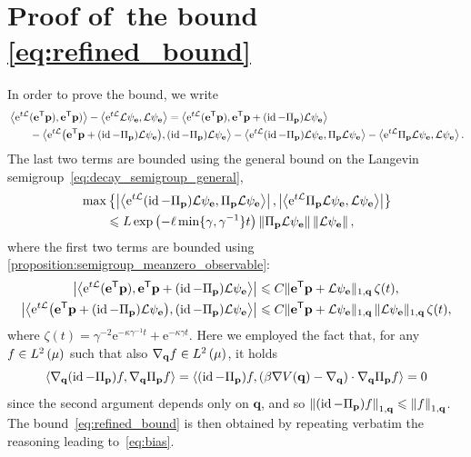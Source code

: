 \documentclass[11pt,a4paper]{article}
\DeclareMathOperator{\id}{id}
\newcommand{\e}{\mathrm{e}}
\newcommand{\grad}{\nabla}
\newcommand{\vect}[1]{\boldsymbol{\mathbf #1}}
\renewcommand{\t}{\mathsf T}
\theoremstyle{plain}
\numberwithin{equation}{section}
\renewcommand{\leq}{\leqslant}
\begin{document}
\section{Proof of~\texorpdfstring{the bound \eqref{eq:refined_bound}}{the technical bound on the bias}}%
\label{sec:proof_technical_result}
In order to prove the bound,
we write
\begin{align*}
    &\ip{\e^{t \mathcal L}(\vect e^\t \vect p)}{\vect e^\t \vect p)} - \ip{\e^{t \mathcal L} \mathcal L \psi_{\vect e}}{\mathcal L \psi_{\vect e}}
    = \ip{\e^{t \mathcal L} (\vect e^\t \vect p)}{\vect e^\t \vect p + (\id - \Pi_{\vect p}) \mathcal L \psi_{\vect e}} \\
    &\qquad - \ip{\e^{t \mathcal L} \bigl(\vect e^\t \vect p + (\id - \Pi_{\vect p}) \mathcal L \psi_{\vect e}\bigr)}{(\id - \Pi_{\vect p}) \mathcal L \psi_{\vect e}}
    - \ip{\e^{t \mathcal L} (\id - \Pi_{\vect p}) \mathcal L \psi_{\vect e}}{\Pi_{\vect p} \mathcal L \psi_{\vect e}}
    - \ip{\e^{t \mathcal L} \Pi_{\vect p} \mathcal L \psi_{\vect e}}{\mathcal L \psi_{\vect e}}.
\end{align*}
The last two terms are bounded using the general bound on the Langevin semigroup~\eqref{eq:decay_semigroup_general},
\begin{align*}
    &\max \left\{
    \abs{\ip{\e^{t \mathcal L} (\id - \Pi_{\vect p}) \mathcal L \psi_{\vect e}}{\Pi_{\vect p} \mathcal L \psi_{\vect e}}},
    \abs{\ip{\e^{t \mathcal L} \Pi_{\vect p} \mathcal L \psi_{\vect e}}{\mathcal L \psi_{\vect e}}}
    \right\} \\
    &\qquad \leq L \exp \left( - \ell \min\{\gamma, \gamma^{-1}\} t\right) \norm{\Pi_{\vect p} \mathcal L \psi_{\vect e}} \norm{\mathcal L \psi_{\vect e}},
\end{align*}
where the first two terms are bounded using \cref{proposition:semigroup_meanzero_observable}:
\begin{align*}
    \abs{\ip{\e^{t \mathcal L} (\vect e^\t \vect p)}{\vect e^\t \vect p + (\id - \Pi_{\vect p}) \mathcal L \psi_{\vect e}}}
    &\leq C \norm*{\vect e^\t \vect p + \mathcal L \psi_{\vect e}}[1,\vect q] \, \zeta(t), \\
    \abs{\ip{\e^{t \mathcal L} \bigl(\vect e^\t \vect p + (\id - \Pi_{\vect p}) \mathcal L \psi_{\vect e}\bigr)}{(\id - \Pi_{\vect p}) \mathcal L \psi_{\vect e}}}
    &\leq C \norm*{\vect e^\t \vect p + \mathcal L \psi_{\vect e}}[1,\vect q] \, \norm*{\mathcal L \psi_{\vect e}}[1,\vect q] \, \zeta(t),
\end{align*}
where $\zeta(t) = \gamma^{-2} \e^{- \kappa \gamma^{-1} t } + \e^{- \kappa \gamma t}$.
Here we employed the fact that, for any $f \in \lp{2}{\mu}$ such that also $\grad_{\vect q} f \in \lp{2}{\mu}$,
it holds
\[
    \ip{\grad_{\vect q} (\id - \Pi_{\vect p}) f}{\grad_{\vect q} \Pi_{\vect p} f}
    = \ip{(\id - \Pi_{\vect p}) f}{(\beta \grad V(\vect q) - \grad_{\vect q}) \cdot \grad_{\vect q} \Pi_{\vect p} f}
    = 0
\]
since the second argument depends only on $\vect q$,
and so $\norm{(\id - \Pi_{\vect p}) f}[1,\vect q] \leq \norm{f}[1,\vect q]$.
The bound~\eqref{eq:refined_bound} is then obtained by repeating verbatim the reasoning leading to~\eqref{eq:bias}.
\end{document}

